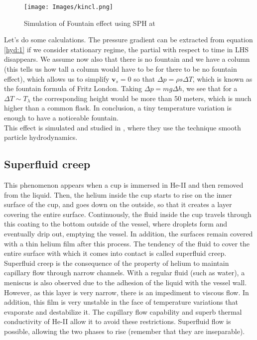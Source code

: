 \documentclass{article}
\begin{document}
\begin{figure}[H]
    \centering
    \texttt{[image: Images/kincl.png]}
    \caption{Simulation of Fountain effect using SPH at \cite{Kincl}}
    \label{fig:enter-label}
\end{figure}

Let's do some calculations. The pressure gradient can be extracted from equation \eqref{hyd:1} if we consider stationary regime, the partial with respect to time in LHS disappears. We assume now also that there is no fountain and we have a column (this tells us how tall a column would have to be for there to be no fountain effect), which allows us to simplify $\mathbf{v}_s = 0$ so that $\Delta p = \rho s \Delta T$, which is known as the fountain formula of Fritz London. Taking $\Delta p = mg \Delta h$, we see that for a $\Delta T \sim T_\lambda$ the corresponding height would be more than 50 meters, which is much higher than a common flask. In conclusion, a tiny temperature variation is enough to have a noticeable fountain.
\\

This effect is simulated and studied in \cite{Kincl}, where they use the technique smooth particle hydrodynamics.

\subsection{Superfluid creep}

This phenomenon appears when a cup is immersed in He-II and then removed from the liquid. Then, the helium inside the cup starts to rise on the inner surface of the cup, and goes down on the outside, so that it creates a layer covering the entire surface. Continuously, the fluid inside the cup travels through this coating to the bottom outside of the vessel, where droplets form and eventually drip out, emptying the vessel. In addition, the surfaces remain covered with a thin helium film after this process. The tendency of the fluid to cover the entire surface with which it comes into contact is called superfluid creep.
\\

Superfluid creep is the consequence of the property of helium to maintain capillary flow through narrow channels. With a regular fluid (such as water), a meniscus is also observed due to the adhesion of the liquid with the vessel wall. However, as this layer is very narrow, there is an impediment to viscous flow. In addition, this film is very unstable in the face of temperature variations that evaporate and destabilize it. The capillary flow capability and superb thermal conductivity of He-II allow it to avoid these restrictions. Superfluid flow is possible, allowing the two phases to rise (remember that they are inseparable).
\\
\end{document}
